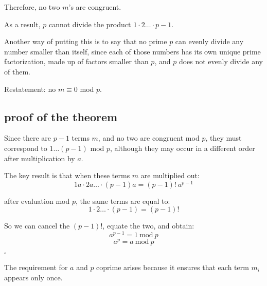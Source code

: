 \documentclass[11pt, oneside]{article}
\begin{document}
Therefore, no two $m$'s are congruent.

As a result, $p$ cannot divide the product $1 \cdot 2 \dots \cdot p-1$.

Another way of putting this is to say that no prime $p$ can evenly divide any number smaller than itself, since each of those numbers has its own unique prime factorization, made up of factors smaller than $p$, and $p$ does not evenly divide any of them.

Restatement:  no $m \equiv 0$ mod $p$.

\subsection*{proof of the theorem}

Since there are $p-1$ terms $m$, and no two are congruent mod $p$, they must correspond to $1 \dots (p-1)$ mod $p$, although they may occur in a different order after multiplication by $a$.

The key result is that when these terms $m$ are multiplied out:
\[ 1a \cdot 2a \dots \cdot (p-1)a = (p-1)! \ a^{p-1} \]

after evaluation mod $p$, the same terms are equal to:
\[ 1 \cdot 2 \dots \cdot (p-1)  = (p-1)! \]

So we can cancel the $(p-1)!$, equate the two, and obtain:
\[ a^{p-1} = 1 \ \text{mod} \ p \]
\[ a^{p} = a \ \text{mod} \ p \]

$\square$

The requirement for $a$ and $p$ coprime arises because it ensures that each term $m_i$ appears only once. 
\end{document}
